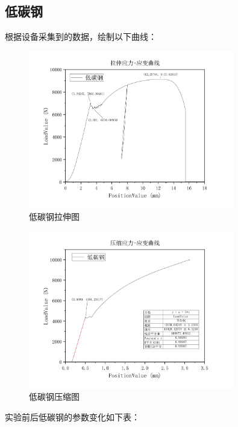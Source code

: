 \documentclass[a4paper,utf8]{article}
\begin{document}
    \subsection{低碳钢}
        根据设备采集到的数据，绘制以下曲线：\newpage
        \begin{figure}[!ht]
            \includegraphics[width=0.8\textwidth]{result/fig1a.pdf}
            \caption{低碳钢拉伸图}
        \end{figure}
        \par
        \begin{figure}[!ht]
            \includegraphics[width=0.8\textwidth]{result/fig1b.pdf}
            \caption{低碳钢压缩图}
        \end{figure}
        实验前后低碳钢的参数变化如下表：\newpage
\end{document}
